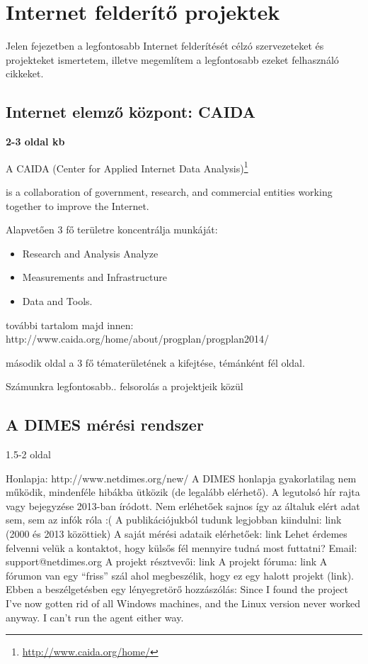 
\section{Internet felderítő projektek}



Jelen fejezetben a legfontosabb Internet felderítését célzó szervezeteket és projekteket ismertetem, illetve megemlítem a legfontosabb ezeket felhasználó cikkeket.

\subsection{Internet elemző központ: CAIDA}

\textbf{2-3 oldal kb}

A CAIDA (Center for Applied Internet Data Analysis)\footnote{\url{http://www.caida.org/home/}} 



is a collaboration of government, research, and commercial entities working together to improve the Internet.

Alapvetően 3 fő területre koncentrálja munkáját:

\begin{itemize}
\item Research and Analysis	Analyze
\item Measurements and Infrastructure
\item Data and Tools.
\end{itemize}

további tartalom majd innen: http://www.caida.org/home/about/progplan/progplan2014/

második oldal a 3 fő tématerületének a kifejtése, témánként fél oldal.

Számunkra legfontosabb.. felsorolás a projektjeik közül


\subsection{A DIMES mérési rendszer}
1.5-2 oldal

Honlapja: http://www.netdimes.org/new/
A DIMES honlapja gyakorlatilag nem működik, mindenféle hibákba ütközik (de legalább elérhető). A legutolsó hír rajta vagy bejegyzése 2013-ban íródott. Nem erléhetőek sajnos így az általuk elért adat sem, sem az infók róla :(
A publikációjukból tudunk legjobban kiindulni: link (2000 és 2013 közöttiek)
A saját mérési adataik elérhetőek: link
Lehet érdemes felvenni velük a kontaktot, hogy külsős fél mennyire tudná most futtatni?
Email: support@netdimes.org
A projekt résztvevői: link
A projekt fóruma: link
A fórumon van egy “friss” szál ahol megbeszélik, hogy ez egy halott projekt (link).
Ebben a beszélgetésben egy lényegretörő hozzászólás:
Since I found the project I've now gotten rid of all Windows machines, and the Linux version never worked anyway. I can't run the agent either way.

